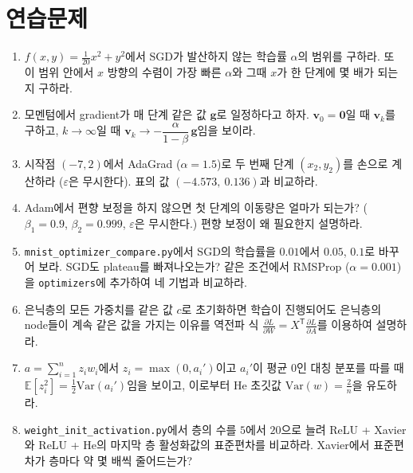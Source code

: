 \documentclass[11pt,a4paper]{article}
\newcommand{\T}{^{\mathsf T}}
\newcommand{\pd}[2]{\frac{\partial #1}{\partial #2}}
\begin{document}
\section{연습문제}

\begin{enumerate}[label=\arabic*.]

\item $f(x,y)=\frac{1}{20}x^2+y^2$에서 SGD가 발산하지 않는 학습률 $\alpha$의 범위를 구하라.
또 이 범위 안에서 $x$ 방향의 수렴이 가장 빠른 $\alpha$와 그때 $x$가 한 단계에 몇 배가 되는지 구하라.

\item 모멘텀에서 gradient가 매 단계 같은 값 $\bm g$로 일정하다고 하자.
$\bm v_0=\bm 0$일 때 $\bm v_k$를 구하고, $k\to\infty$일 때 $\bm v_k\to-\dfrac{\alpha}{1-\beta}\,\bm g$임을 보이라.

\item 시작점 $(-7,2)$에서 AdaGrad ($\alpha=1.5$)로 두 번째 단계 $(x_2,y_2)$를 손으로 계산하라
($\varepsilon$은 무시한다). 표의 값 $(-4.573,\ 0.136)$과 비교하라.

\item Adam에서 편향 보정을 하지 않으면 첫 단계의 이동량은 얼마가 되는가?
($\beta_1=0.9$, $\beta_2=0.999$, $\varepsilon$은 무시한다.) 편향 보정이 왜 필요한지 설명하라.

\item \texttt{mnist\_optimizer\_compare.py}에서 SGD의 학습률을 $0.01$에서 $0.05$, $0.1$로 바꾸어 보라.
SGD도 plateau를 빠져나오는가? 같은 조건에서 RMSProp ($\alpha=0.001$)을 \texttt{optimizers}에 추가하여
네 기법과 비교하라.

\item 은닉층의 모든 가중치를 같은 값 $c$로 초기화하면 학습이 진행되어도 은닉층의 node들이
계속 같은 값을 가지는 이유를 역전파 식 $\pd{L}{W}=X\T\pd{L}{A}$를 이용하여 설명하라.

\item $a=\sum_{i=1}^{n}z_iw_i$에서 $z_i=\max(0,a_i')$이고 $a_i'$이 평균 $0$인 대칭 분포를 따를 때
$\mathbb E[z_i^2]=\frac12\mathrm{Var}(a_i')$임을 보이고, 이로부터 He 초깃값 $\mathrm{Var}(w)=\frac2n$을 유도하라.

\item \texttt{weight\_init\_activation.py}에서 층의 수를 $5$에서 $20$으로 늘려
ReLU + Xavier와 ReLU + He의 마지막 층 활성화값의 표준편차를 비교하라.
Xavier에서 표준편차가 층마다 약 몇 배씩 줄어드는가?


\end{enumerate}
\end{document}
